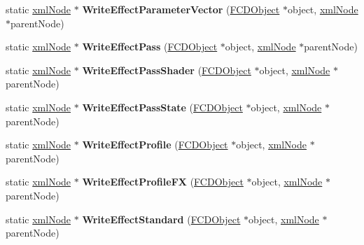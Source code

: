 \begin{DoxyCompactItemize}
\item 
\hypertarget{classFArchiveXML_a98909f975a7248398a4a6a1acc54ad8f}{
static \hyperlink{struct__xmlNode}{xmlNode} $\ast$ {\bfseries WriteEffectParameterVector} (\hyperlink{classFCDObject}{FCDObject} $\ast$object, \hyperlink{struct__xmlNode}{xmlNode} $\ast$parentNode)}
\label{classFArchiveXML_a98909f975a7248398a4a6a1acc54ad8f}

\item 
\hypertarget{classFArchiveXML_a6e11d622bef18fbcbac01a1fcbff58e7}{
static \hyperlink{struct__xmlNode}{xmlNode} $\ast$ {\bfseries WriteEffectPass} (\hyperlink{classFCDObject}{FCDObject} $\ast$object, \hyperlink{struct__xmlNode}{xmlNode} $\ast$parentNode)}
\label{classFArchiveXML_a6e11d622bef18fbcbac01a1fcbff58e7}

\item 
\hypertarget{classFArchiveXML_afbeb2fbcb6e08176a38fa7f73fbcc0df}{
static \hyperlink{struct__xmlNode}{xmlNode} $\ast$ {\bfseries WriteEffectPassShader} (\hyperlink{classFCDObject}{FCDObject} $\ast$object, \hyperlink{struct__xmlNode}{xmlNode} $\ast$parentNode)}
\label{classFArchiveXML_afbeb2fbcb6e08176a38fa7f73fbcc0df}

\item 
\hypertarget{classFArchiveXML_a03b67e399940cd8b4c84a8247549aa1b}{
static \hyperlink{struct__xmlNode}{xmlNode} $\ast$ {\bfseries WriteEffectPassState} (\hyperlink{classFCDObject}{FCDObject} $\ast$object, \hyperlink{struct__xmlNode}{xmlNode} $\ast$parentNode)}
\label{classFArchiveXML_a03b67e399940cd8b4c84a8247549aa1b}

\item 
\hypertarget{classFArchiveXML_a8017fd5292b911ac9a83654f67926fcd}{
static \hyperlink{struct__xmlNode}{xmlNode} $\ast$ {\bfseries WriteEffectProfile} (\hyperlink{classFCDObject}{FCDObject} $\ast$object, \hyperlink{struct__xmlNode}{xmlNode} $\ast$parentNode)}
\label{classFArchiveXML_a8017fd5292b911ac9a83654f67926fcd}

\item 
\hypertarget{classFArchiveXML_acc902d6745cbe50e436ddbef3567d5b6}{
static \hyperlink{struct__xmlNode}{xmlNode} $\ast$ {\bfseries WriteEffectProfileFX} (\hyperlink{classFCDObject}{FCDObject} $\ast$object, \hyperlink{struct__xmlNode}{xmlNode} $\ast$parentNode)}
\label{classFArchiveXML_acc902d6745cbe50e436ddbef3567d5b6}

\item 
\hypertarget{classFArchiveXML_af44165c1856eae4b5f5d7b376085d58c}{
static \hyperlink{struct__xmlNode}{xmlNode} $\ast$ {\bfseries WriteEffectStandard} (\hyperlink{classFCDObject}{FCDObject} $\ast$object, \hyperlink{struct__xmlNode}{xmlNode} $\ast$parentNode)}
\label{classFArchiveXML_af44165c1856eae4b5f5d7b376085d58c}


\end{DoxyCompactItemize}
